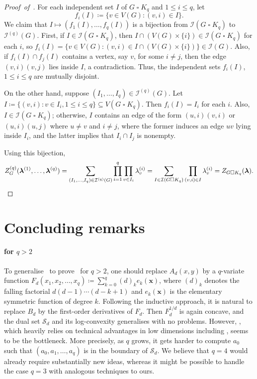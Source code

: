 \documentclass{article}
\numberwithin{equation}{section}
\theoremstyle{plain}
\theoremstyle{definition}
\theoremstyle{remark} %
\newcommand{\defeq}{\coloneqq}
\newcommand{\calI}{\mathcal{I}}
\newcommand{\calS}{\mathcal{S}}
\newcommand{\blambda}{\bm{\lambda}}
\newcommand{\cart}{\mathbin{\square}} %
\begin{document}
\begin{proof}[Proof~of~]
    For each independent set \(I\) of \(G\cart K_q\) and $1\le i\le q$, let
    \[
        f_i(I)\defeq \{v\in V(G) : (v,i)\in I\}.
    \]
    We claim that \(I\mapsto (f_1(I),\dots,f_q(I))\) is a bijection from \(\calI(G\cart K_q)\) to \(\calI^{(q)}(G)\).
    First, if \(I\in \calI(G\cart K_q)\), then \(I\cap (V(G)\times\{i\})\in \calI(G\cart K_q)\) for each \(i\), so \(f_i(I) = \{v\in V(G) : (v,i)\in I\cap (V(G)\times \{i\})\} \in \calI(G)\). Also, if \(f_i(I)\cap f_j(I)\) contains a vertex, say \(v\), for some \(i\neq j\), then the edge \((v,i)(v,j)\) lies inside \(I\), a contradiction. Thus, the independent sets \(f_i(I)\), \(1\le i\le q\) are mutually disjoint.
    
    On the other hand, suppose \((I_1,\dots,I_q)\in \calI^{(q)}(G)\). Let \(I\defeq \{(v,i) : v\in I_i, 1\le i\le q\}\subseteq V(G\cart K_q)\). Then \(f_i(I)=I_i\) for each \(i\). Also, \(I\in \calI(G\cart K_q)\); otherwise, \(I\) contains an edge of the form \((u,i)(v,i)\) or \((u,i)(u,j)\) where \(u\neq v\) and \(i\neq j\), where the former induces an edge \(uv\) lying inside \(I_i\), and the latter implies that \(I_i\cap I_j\) is nonempty.
    
    Using this bijection,
    \[
        Z^{(q)}_G(\blambda^{(1)},\dots,\blambda^{(q)})
        = \sum_{(I_1,\dots,I_q)\in \calI^{(q)}(G)} \prod_{i=1}^q \prod_{v\in I_i} \lambda^{(i)}_v
        = \sum_{I\in \calI(G\cart K_q)} \prod_{(v,i)\in I} \lambda^{(i)}_v
        = Z_{G\cart K_q}(\blambda).
        \qedhere
    \]
\end{proof}




\section{Concluding remarks}

\paragraph{ for $q>2$} To generalise~ to prove~ for $q>2$, one should replace $A_d(x,y)$ by a $q$-variate function $F_d(x_1,x_2,\dots,x_q)\defeq \sum_{k=0}^{q} (d)_k e_{k}(\mathbf{x})$, where $(d)_k$ denotes the falling factorial $d(d-1)\cdots(d-k+1)$ and $e_k(\mathbf{x})$ is the elementary symmetric function of degree $k$. Following the inductive approach, it is natural to replace $B_d$ by the first-order derivatives of $F_d$.
Then $F_d^{1/d}$ is again concave, and the dual set $\calS_d$ and its log-convexity generalises with no problems. However, , which heavily relies on technical advantages in low dimensions including , seems to be the bottleneck. More precisely, as $q$ grows, it gets harder to compute $a_0$ such that $(a_0,a_1,\dots,a_q)$ is in the boundary of $\calS_d$. We believe that $q=4$ would already require substantially new ideas, whereas it might be possible to handle the case $q=3$ with analogous techniques to ours. 
\end{document}
